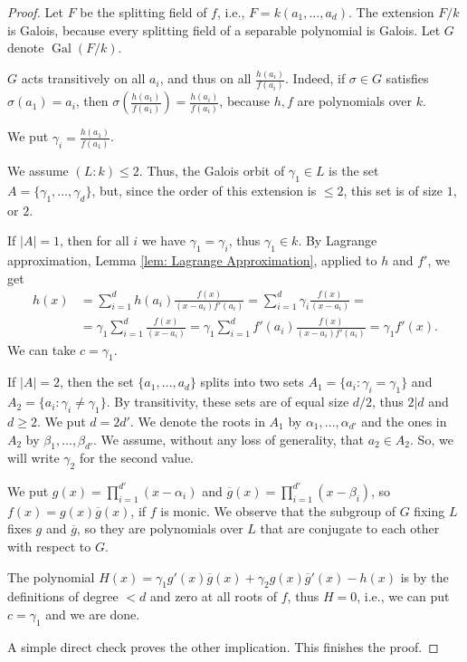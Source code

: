 \documentclass{amsart}
\newcommand{\op}{\operatorname}
\theoremstyle{definition}
\begin{document}
\begin{proof}
    Let $F$ be the splitting field of $f$, i.e., $F=k(a_1,\ldots,a_d)$. The extension $F/k$ is Galois, because every splitting field of a separable polynomial is Galois. Let $G$ denote $\op{Gal}(F/k)$.

    $G$ acts transitively on all $a_i$, and thus on all $\frac{h(a_i)}{f(a_i)}$. Indeed, if $\sigma\in G$ satisfies $\sigma(a_1)=a_i$, then $\sigma(\frac{h(a_1)}{f(a_1)})=\frac{h(a_i)}{f(a_i)}$, because $h,f$ are polynomials over $k$.

    We put $\gamma_i=\frac{h(a_1)}{f(a_1)}$.
    
    We assume $(L:k)\le 2$. Thus, the Galois orbit of $\gamma_1\in L$ is the set $A=\{\gamma_1,\ldots,\gamma_d\}$, but, since the order of this extension is $\le 2$, this set is of size $1$, or $2$.

    If $|A|=1$, then for all $i$ we have $\gamma_1=\gamma_i$, thus $\gamma_1\in k$. By Lagrange approximation, Lemma \ref{lem: Lagrange Approximation}, applied to $h$ and $f'$, we get
    \begin{align*}
     h(x)&=\sum_{i=1}^d h(a_i)\frac{f(x)}{(x-a_i)f'(a_i)}=\sum_{i=1}^d \gamma_i\frac{f(x)}{(x-a_i)}=\\
     &=\gamma_1\sum_{i=1}^d \frac{f(x)}{(x-a_i)}=\gamma_1\sum_{i=1}^d f'(a_i)\frac{f(x)}{(x-a_i)f'(a_i)}=\gamma_1f'(x).
    \end{align*}
    We can take $c=\gamma_1$.

    If $|A|=2$, then the set $\{a_1,\ldots,a_d\}$ splits into two sets $A_1=\{a_i: \gamma_i=\gamma_1\}$ and $A_2=\{a_i: \gamma_i\ne\gamma_1\}$. By transitivity, these sets are of equal size $d/2$, thus $2|d$ and $d\ge 2$. We put $d=2d'$. We denote the roots in $A_1$ by $\alpha_1,\ldots,\alpha_{d'}$ and the ones in $A_2$ by $\beta_1,\ldots,\beta_{d'}$. We assume, without any loss of generality, that $a_2\in A_2$. So, we will write $\gamma_2$ for the second value.
    
    We put $g(x)=\prod_{i=1}^{d'}(x-\alpha_i)$ and $\overline{g}(x)=\prod_{i=1}^{d'}(x-\beta_i)$, so $f(x)=g(x)\overline{g}(x)$, if $f$ is monic. We observe that the subgroup of $G$ fixing $L$ fixes $g$ and $\overline{g}$, so they are polynomials over $L$ that are conjugate to each other with respect to $G$.

    The polynomial $H(x)=\gamma_1 g'(x)\overline{g}(x)+\gamma_2 g(x)\overline{g}'(x)-h(x)$ is by the definitions of degree $<d$ and zero at all roots of $f$, thus $H=0$, i.e., we can put $c=\gamma_1$ and we are done.

    A simple direct check proves the other implication. 
    This finishes the proof.
\end{proof}
\end{document}
